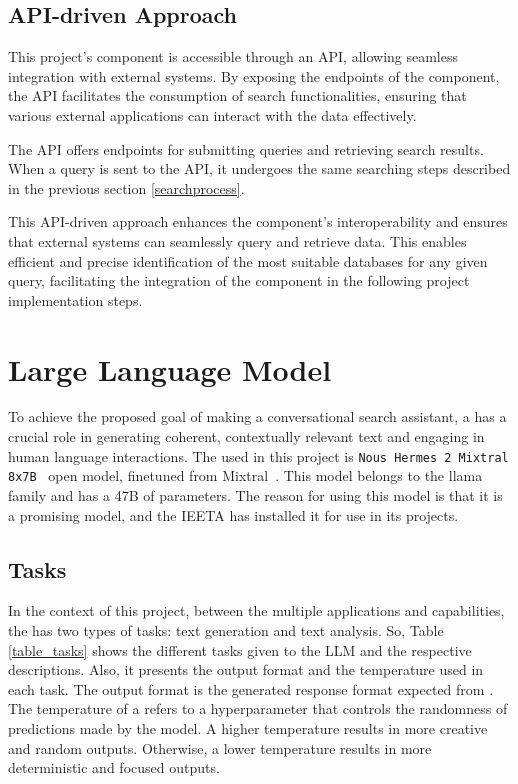 \subsection{API-driven Approach}

This project's {\ir} component is accessible through an API, allowing seamless integration with external systems. By exposing the endpoints of the {\ir} component, the API facilitates the consumption of search functionalities, ensuring that various external applications can interact with the data effectively.

The API offers endpoints for submitting queries and retrieving search results. When a query is sent to the API, it undergoes the same searching steps described in the previous section \ref{searchprocess}.

This API-driven approach enhances the {\ir} component's interoperability and ensures that external systems can seamlessly query and retrieve data. This enables efficient and precise identification of the most suitable databases for any given query, facilitating the integration of the {\ir} component in the following project implementation steps.




\section{Large Language Model}

To achieve the proposed goal of making a conversational search assistant, a {\llm} has a crucial role in generating coherent, contextually relevant text and engaging in human language interactions. The {\llm} used in this project is \texttt{Nous Hermes 2 Mixtral 8x7B}~\cite{Nous-Hermes-2-Mixtral-8x7B-DPO} open model, finetuned from Mixtral~\cite{jiang2024a}. This model belongs to the llama family and has a 47B of parameters. The reason for using this {\llm} model is that it is a promising model, and the IEETA has installed it for use in its projects.


\subsection{Tasks}

In the context of this project, between the multiple applications and capabilities, the {\llm} has two types of tasks: text generation and text analysis. So, Table \ref{table_tasks} shows the different tasks given to the LLM and the respective descriptions. Also, it presents the output format and the temperature used in each task. The output format is the generated response format expected from {\llm}. The temperature of a {\llm} refers to a hyperparameter that controls the randomness of predictions made by the model. A higher temperature results in more creative and random outputs. Otherwise, a lower temperature results in more deterministic and focused outputs.

